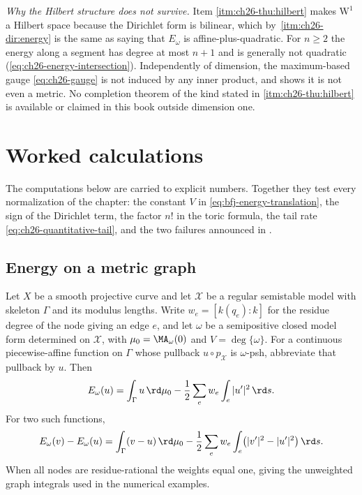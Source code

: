 \begin{remark}
\emph{Why the Hilbert structure does not survive.}  Item
\cref{itm:ch26-thu:hilbert} makes $\mathrm W^1$ a Hilbert space because the
Dirichlet form is bilinear, which by
\,\cref{itm:ch26-dir:energy} is the same
as saying that $E_\omega$ is affine-plus-quadratic.  For $n\geq2$ the
energy along a segment has degree at most $n+1$ and is generally not
quadratic (\eqref{eq:ch26-energy-intersection}).  Independently of dimension,
the maximum-based gauge
\eqref{eq:ch26-gauge} is not induced by any inner product, and
 shows it is not even a metric.  No completion
theorem of the kind stated in \cref{itm:ch26-thu:hilbert} is available or
claimed in this book outside dimension one.
\end{remark}

\section{Worked calculations}
\label{sec:ch26-examples}

The computations below are carried to explicit numbers.  Together they
test every normalization of the chapter: the constant $V$ in
\eqref{eq:bfj-energy-translation}, the sign of the Dirichlet term, the
factor $n!$ in the toric formula, the tail rate
\eqref{eq:ch26-quantitative-tail}, and the two failures announced in
.

\subsection{Energy on a metric graph}
\label{sec:ch26-ex-graph}

\begin{proposition}
\label{prop:ch26-graph-energy}
Let $X$ be a smooth projective curve and let $\mathcal X$ be a regular
semistable model with skeleton $\Gamma$ and its modulus lengths.
Write $w_e=[k(q_e):k]$ for the residue degree of the node giving an edge
$e$, and let $\omega$ be a semipositive closed model form determined on
$\mathcal X$, with $\mu_0=\MA_\omega(0)$ and $V=\deg\{\omega\}$.
For a continuous piecewise-affine function on $\Gamma$ whose pullback
$u\circ p_{\mathcal X}$ is $\omega$-psh, abbreviate that pullback by $u$.
Then
\begin{equation}
\label{eq:ch26-graph-energy}
 E_\omega(u)=\int_\Gamma u\,\rd\mu_0
             -\frac12\sum_e w_e\int_e|u'|^2\,\rd s.
\end{equation}
For two such functions,
\begin{equation}
\label{eq:ch26-graph-energy-difference}
 E_\omega(v)-E_\omega(u)
 =\int_\Gamma(v-u)\,\rd\mu_0
  -\frac12\sum_e w_e\int_e\bigl(|v'|^2-|u'|^2\bigr)\,\rd s.
\end{equation}
When all nodes are residue-rational the weights equal one, giving the
unweighted graph integrals used in the numerical examples.
\end{proposition}

